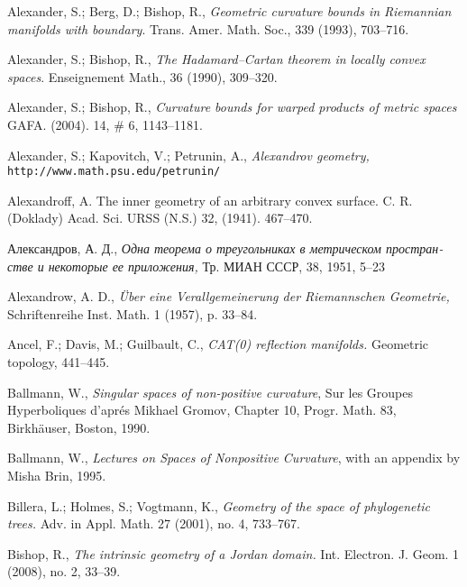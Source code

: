 \begin{thebibliography}{52}

Alexander, S.; Berg, D.; Bishop, R., 
\textit{Geometric curvature bounds in Riemannian manifolds with boundary}. 
Trans. Amer. Math. Soc., 339 (1993), 703--716.

Alexander, S.; 
Bishop, R., 
\textit{The Hadamard--Cartan theorem in locally convex spaces}. 
Enseignement Math., 
36 
(1990), 
309--320.

Alexander, S.; 
Bishop, R., 
\textit{Curvature bounds for warped products of metric spaces}
GAFA. 
(2004). 
14, 
\# 6, 
1143--1181.

Alexander, S.;
Kapovitch, V.;
Petrunin, A.,
\textit{Alexandrov geometry,}
 \texttt{http://www.math.psu.edu/petrunin/}
 
 Alexandroff, A.
The inner geometry of an arbitrary convex surface.
C. R. (Doklady) Acad. Sci. URSS (N.S.) 32, (1941). 467--470.

\begin{otherlanguage}{russian}
Александров, А. Д.,
\textit{Одна теорема о треугольниках в метрическом пространстве и некоторые ее приложения,}
Тр. МИАН СССР, 38, 1951, 5--23
\end{otherlanguage}


 Alexandrow, A. D.,  \textit{\"Uber eine Verallgemeinerung der Riemannschen Geometrie,}
Schriftenreihe Inst. Math. 
1 
(1957), 
p. 33--84.

 Ancel, F.; Davis, M.; Guilbault, C.,
\textit{CAT(0) reflection manifolds.} 
Geometric topology, 
441--445.

Ballmann, W., 
\textit{Singular spaces of non-positive curvature}, 
Sur les Groupes Hyperboliques d'apr\'{e}s Mikhael Gromov, Chapter 10, Progr. Math. 83, Birkh\"auser, Boston, 1990. 

Ballmann, W., \textit{Lectures on Spaces of Nonpositive Curvature},
with an appendix by Misha Brin, 1995. 

Billera, L.; 
Holmes, S.; 
Vogtmann, K., 
\textit{Geometry of the space of phylogenetic trees.}
Adv. in Appl. Math. 
27 
(2001), 
no. 4, 
733--767.

Bishop, R., 
\textit{The intrinsic geometry of a Jordan domain.} 
Int. Electron. J. Geom. 
1 
(2008), 
no. 2, 
33--39.


\end{thebibliography}

